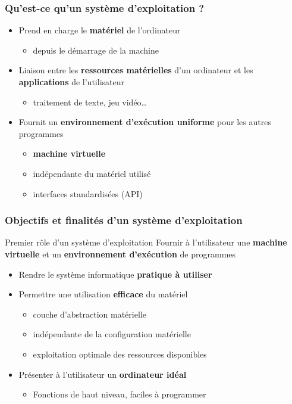 \begin{frame}
\frametitle{Qu’est-ce qu’un système d’exploitation ?}
\begin{itemize}
\item Prend en charge le \textbf{matériel} de l'ordinateur
\begin{itemize}
\item depuis le démarrage de la machine
\end{itemize}

\item Liaison entre les \textbf{ressources matérielles} d'un ordinateur
et les \textbf{applications} de l'utilisateur
\begin{itemize}
\item traitement de texte, jeu vidéo…
\end{itemize}
\item Fournit un \textbf{environnement d'exécution uniforme} pour les autres programmes
\begin{itemize}
\item \textbf{machine virtuelle}
\item indépendante du matériel utilisé
\item interfaces standardisées (API)
\end{itemize}

\end{itemize}
\end{frame}



\begin{frame}
\frametitle{Objectifs et finalités d’un système d’exploitation}
\begin{block}{Premier rôle d'un système d'exploitation}
Fournir à l'utilisateur une \textbf{machine virtuelle} et un \textbf{environnement
d'exécution} de programmes
\end{block}
\begin{itemize}
\item Rendre le système informatique \textbf{pratique à utiliser}
\item Permettre une utilisation \textbf{efficace} du matériel
\begin{itemize}
\item couche d'abstraction matérielle
\item indépendante de la configuration matérielle
\item exploitation optimale des ressources disponibles
\end{itemize}
\item Présenter à l’utilisateur un \textbf{ordinateur idéal}
\begin{itemize}
\item Fonctions de haut niveau, faciles à programmer
\end{itemize}
\end{itemize}
\end{frame}


